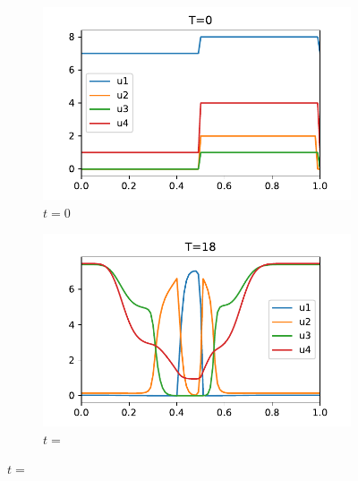 \documentclass[a4paper]{article}
\numberwithin{equation}{section}
\theoremstyle{plain}
\theoremstyle{definition}
\numberwithin{theorem}{section}
\newcommand{\1}{\mathbbm{1}}
\begin{document}
\begin{figure}
    \centering
    \begin{subfigure}[b]{0.49\textwidth}
        \includegraphics[width=\textwidth]{plots/ADP_sol_00.pdf}
        \caption{$t=0$}
        \label{fig:sol_ADP00}
    \end{subfigure}
    \begin{subfigure}[b]{0.49\textwidth}
        \includegraphics[width=\textwidth]{plots/ADP_sol_18.pdf}
        \caption{$t=$}
        \label{fig:sol_ADP18}
    \end{subfigure}
    

\end{figure}
\end{document}
